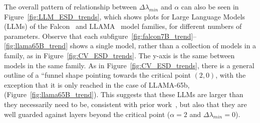 The overall pattern of relationship between $\Delta\lambda_{min}$ and $\alpha$ can also be seen in 
Figure~\ref{fig:LLM_ESD_trends}, which shows plots for Large Language Models (LLMs) of the Falcon~\cite{falcon40b} and 
LLAMA~\cite{touvron2023_TR} model families, for different numbers of parameters. Observe that each 
subfigure~\ref{fig:falcon7B_trend}--\ref{fig:llama65B_trend} shows a single 
model, rather than a collection of models in a family, as in Figure~\ref{fig:CV_ESD_trends}.
The y-axis is the same between models in the same family. 
As in Figure~\ref{fig:CV_ESD_trends}, there is a general outline of a ``funnel shape pointing towards the critical 
point $(2, 0)$, with the exception that it is only reached in the case of LLAMA-65b, (Figure~\ref{fig:llama65B_trend}). 
This suggests that these LLMs are larger than they necessarily need to be, consistent with prior work~\cite{YHTx21_TR}, 
but also that they are well guarded against \OverRegularized layers beyond the critical point
($\alpha=2$ and $\Delta\lambda_{min}=0$).


